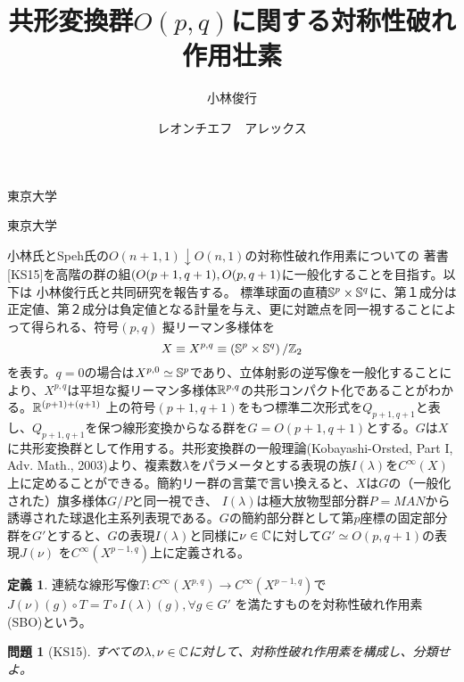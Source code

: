 \documentclass[12pt]{msjproc} %
\newtheorem{question}{問題}
\theoremstyle{definition}
\newtheorem{definition}{定義}
\theoremstyle{remark}
\begin{document}
\title{共形変換群$O(p,q)$に関する対称性破れ作用壮素}

  \author{小林俊行}{東京大学}
  \author{レオンチエフ　アレックス}{東京大学}




  \maketitle

小林氏とSpeh氏の$O(n+1,1)\downarrow O(n,1)$の対称性破れ作用素についての
著書[KS15]\footnotemark[\ref{note1}]を高階の群の組$\left(O(p+1,q+1),O(p,q+1\right)$に一般化することを目指す。以下は
小林俊行氏と共同研究を報告する。
標準球面の直積$\mathbb{S}^p\times\mathbb{S}^q$に、第１成分は正定値、第２成分は負定値となる計量を与え、更に対蹠点を同一視することによって得られる、符号$(p,q)$	擬リーマン多様体を\vspace{-0.6cm}
\begin{equation*}
	X\equiv X^{p,q}\equiv \left( \Sp^p\times\Sp^q \right)/\Z_2
	\vspace{-0.2cm}
\end{equation*}
を表す。$q=0$の場合は$X^{p,0}\simeq \mathbb{S}^p$であり、立体射影の逆写像を一般化することにより、$X^{p,q}$は平坦な擬リーマン多様体$\mathbb{R}^{p,q}$の共形コンパクト化であることがわかる。$\mathbb{R}^{\left( p+ 1\right)+\left( q+ 1\right)}$
上の符号$(p+1,q+1)$をもつ標準二次形式を$Q_{p+1,q+1}$と表し、$Q_{p+1,q+1}$を保つ線形変換からなる群を$G=O(p+1,q+1)$とする。$G$は$X$に共形変換群として作用する。共形変換群の一般理論(Kobayashi-Orsted, Part I, Adv. Math., 
2003)より、複素数$\lambda$をパラメータとする表現の族$I(\lambda)$を$C^\infty(X)$上に定めることができる。簡約リー群の言葉で言い換えると、$X$は$G$の（一般化された）旗多様体$G/P$と同一視でき、
$I(\lambda)$は極大放物型部分群$P=MAN$から誘導された球退化主系列表現である。$G$の簡約部分群として第$p$座標の固定部分群を$G'$とすると、$G$の表現$I(\lambda)$と同様に$\nu\in\mathbb{C}$に対して$G'\simeq O(p,q+1)$の表現$J(\nu)$
を$C^\infty(X^{p-1,q})$上に定義される。
\begin{definition}
	連続な線形写像$T:C^\infty(X^{p,q})\to C^\infty(X^{p-1,q})$で
		$J(\nu)(g)\circ T=T\circ I(\lambda)(g),\forall g\in G'$
を満たすものを対称性破れ作用素(SBO)という。
\end{definition}
\begin{question}[KS15]
	すべての$\lambda,\nu\in\mathbb{C}$に対して、対称性破れ作用素を構成し、分類せよ。\vspace{-0.2cm}
\end{question}
\end{document}
